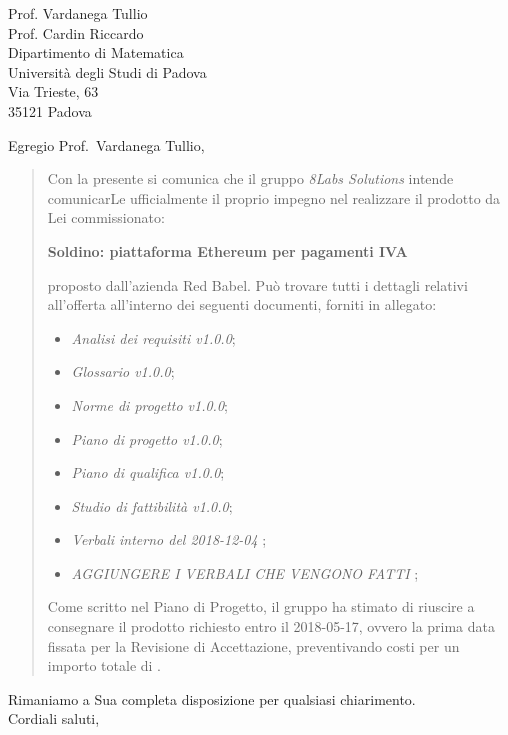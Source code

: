 \begin{letter}{
		Prof. Vardanega Tullio \\
		Prof. Cardin Riccardo \\
		Dipartimento di Matematica \\
		Università degli Studi di Padova \\
		Via Trieste, 63 \\
		35121 Padova}
		
\opening{Egregio Prof.~Vardanega Tullio,}

\begin{quotation}
Con la presente si comunica che il gruppo \textit{8Labs Solutions} intende 
comunicarLe ufficialmente il proprio impegno nel realizzare il prodotto da Lei 
commissionato:

\begin{center}
	\textbf{Soldino: piattaforma Ethereum per pagamenti IVA}
\end{center}

\noindent proposto dall'azienda Red Babel.
Può trovare tutti i dettagli relativi all'offerta all'interno dei seguenti 
documenti, forniti in allegato:

\begin{itemize}
	\item \textit{Analisi dei requisiti v1.0.0};
	
	\item \textit{Glossario v1.0.0};
	
	\item \textit{Norme di progetto v1.0.0};

	\item \textit{Piano di progetto v1.0.0};

	\item \textit{Piano di qualifica v1.0.0};

	\item \textit{Studio di fattibilità v1.0.0};

	\item \textit{Verbali interno del 2018-12-04}	;
	
	\item \textit{AGGIUNGERE I VERBALI CHE VENGONO FATTI}	;	
\end{itemize}

\noindent Come scritto nel Piano di Progetto, il gruppo ha stimato di riuscire a 
consegnare il prodotto richiesto entro il 2018-05-17, ovvero la prima data 
fissata per la Revisione di Accettazione, preventivando costi per un importo 
totale di .
\end{quotation}

\closing{Rimaniamo a Sua completa disposizione per qualsiasi chiarimento. \\
		Cordiali saluti, }
		
\end{letter}


